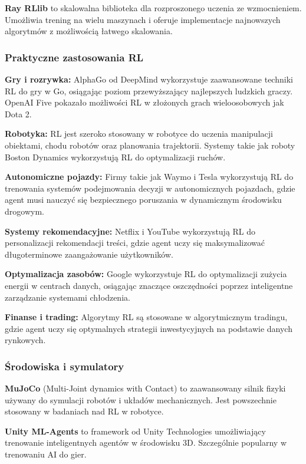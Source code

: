 \documentclass[12pt,a4paper]{article}
\begin{document}
\textbf{Ray RLlib} to skalowalna biblioteka dla rozproszonego uczenia ze wzmocnieniem. Umożliwia trening na wielu maszynach i oferuje implementacje najnowszych algorytmów z możliwością łatwego skalowania.

\subsubsection{Praktyczne zastosowania RL}

\textbf{Gry i rozrywka:} AlphaGo od DeepMind wykorzystuje zaawansowane techniki RL do gry w Go, osiągając poziom przewyższający najlepszych ludzkich graczy. OpenAI Five pokazało możliwości RL w złożonych grach wieloosobowych jak Dota 2.

\textbf{Robotyka:} RL jest szeroko stosowany w robotyce do uczenia manipulacji obiektami, chodu robotów oraz planowania trajektorii. Systemy takie jak roboty Boston Dynamics wykorzystują RL do optymalizacji ruchów.

\textbf{Autonomiczne pojazdy:} Firmy takie jak Waymo i Tesla wykorzystują RL do trenowania systemów podejmowania decyzji w autonomicznych pojazdach, gdzie agent musi nauczyć się bezpiecznego poruszania w dynamicznym środowisku drogowym.

\textbf{Systemy rekomendacyjne:} Netflix i YouTube wykorzystują RL do personalizacji rekomendacji treści, gdzie agent uczy się maksymalizować długoterminowe zaangażowanie użytkowników.

\textbf{Optymalizacja zasobów:} Google wykorzystuje RL do optymalizacji zużycia energii w centrach danych, osiągając znaczące oszczędności poprzez inteligentne zarządzanie systemami chłodzenia.

\textbf{Finanse i trading:} Algorytmy RL są stosowane w algorytmicznym tradingu, gdzie agent uczy się optymalnych strategii inwestycyjnych na podstawie danych rynkowych.

\subsubsection{Środowiska i symulatory}

\textbf{MuJoCo} (Multi-Joint dynamics with Contact) to zaawansowany silnik fizyki używany do symulacji robotów i układów mechanicznych. Jest powszechnie stosowany w badaniach nad RL w robotyce.

\textbf{Unity ML-Agents} to framework od Unity Technologies umożliwiający trenowanie inteligentnych agentów w środowisku 3D. Szczególnie popularny w trenowaniu AI do gier.
\end{document}

